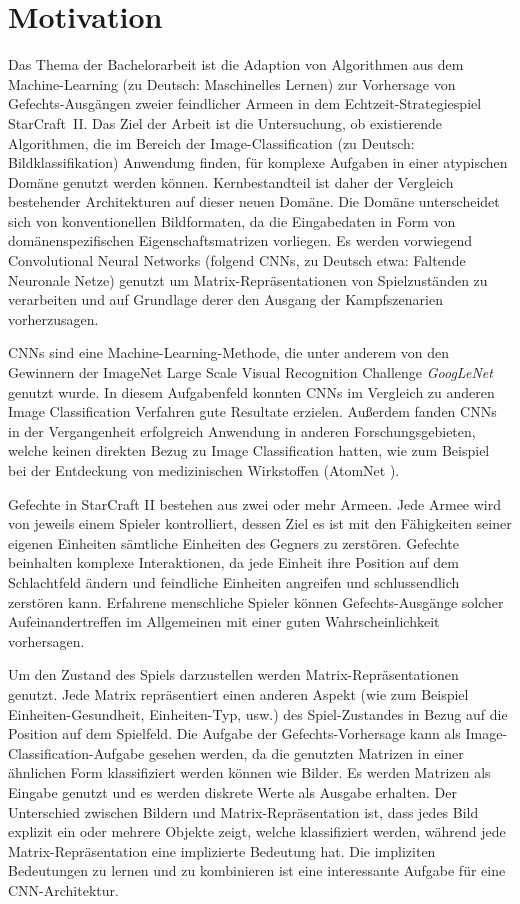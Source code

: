 \section{Motivation}

Das Thema der Bachelorarbeit ist die Adaption von Algorithmen aus dem Machine-Learning (zu Deutsch: Maschinelles Lernen) zur Vorhersage von Gefechts-Ausgängen zweier feindlicher Armeen in dem Echtzeit-Strategiespiel StarCraft~II. Das Ziel der Arbeit ist die Untersuchung, ob existierende Algorithmen, die im Bereich der Image-Classification (zu Deutsch: Bildklassifikation) Anwendung finden, für komplexe Aufgaben in einer atypischen Domäne genutzt werden können. Kernbestandteil ist daher der Vergleich bestehender Architekturen auf dieser neuen Domäne. Die Domäne unterscheidet sich von konventionellen Bildformaten, da die Eingabedaten in Form von domänenspezifischen Eigenschaftsmatrizen vorliegen. Es werden vorwiegend Convolutional Neural Networks (folgend CNNs, zu Deutsch etwa: Faltende Neuronale Netze) genutzt um Matrix-Repräsentationen von Spielzuständen zu verarbeiten und auf Grundlage derer den Ausgang der Kampfszenarien vorherzusagen. 

CNNs sind eine Machine-Learning-Methode, die unter anderem von den Gewinnern der ImageNet Large Scale Visual Recognition Challenge \textit{GoogLeNet} \parencite{DBLP:journals/corr/SzegedyLJSRAEVR14} genutzt wurde. In diesem Aufgabenfeld konnten CNNs im Vergleich zu anderen Image Classification Verfahren gute Resultate erzielen. Außerdem fanden CNNs in der Vergangenheit erfolgreich Anwendung in anderen Forschungsgebieten, welche keinen direkten Bezug zu Image Classification hatten, wie zum Beispiel bei der Entdeckung von medizinischen Wirkstoffen (AtomNet \parencite{DBLP:journals/corr/WallachDH15}).

Gefechte in StarCraft II bestehen aus zwei oder mehr Armeen. Jede Armee wird von jeweils einem Spieler kontrolliert, dessen Ziel es ist mit den Fähigkeiten seiner eigenen Einheiten sämtliche Einheiten des Gegners zu zerstören. Gefechte beinhalten komplexe Interaktionen, da jede Einheit ihre Position auf dem Schlachtfeld ändern und feindliche Einheiten angreifen und schlussendlich zerstören kann. Erfahrene menschliche Spieler können Gefechts-Ausgänge solcher Aufeinandertreffen im Allgemeinen mit einer guten Wahrscheinlichkeit vorhersagen.

Um den Zustand des Spiels darzustellen werden Matrix-Repräsentationen genutzt. Jede Matrix repräsentiert einen anderen Aspekt (wie zum Beispiel Einheiten-Gesundheit, Einheiten-Typ, usw.) des Spiel-Zustandes in Bezug auf die Position auf dem Spielfeld. Die Aufgabe der Gefechts-Vorhersage kann als Image-Classification-Aufgabe gesehen werden, da die genutzten Matrizen in einer ähnlichen Form klassifiziert werden können wie Bilder. Es werden Matrizen als Eingabe genutzt und es werden diskrete Werte als Ausgabe erhalten. Der Unterschied zwischen Bildern und Matrix-Repräsentation ist, dass jedes Bild explizit ein  oder mehrere Objekte zeigt, welche klassifiziert werden, während jede Matrix-Repräsentation eine implizierte Bedeutung hat. Die impliziten Bedeutungen zu lernen und zu kombinieren ist eine interessante Aufgabe für eine CNN-Architektur.

